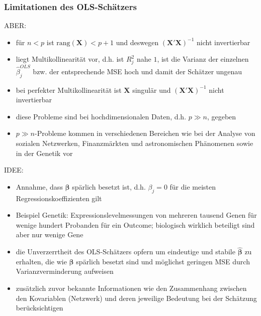 \documentclass{beamer}
\begin{document}
\begin{frame} %
  \frametitle{Limitationen des OLS-Schätzers} 
  ABER: 
    \begin{itemize}
    \item für $n < p$ ist $\text{rang}(\mathbf{X}
    )<p+1$ und deswegen $\left(\mathbf{X}'\mathbf{X}\right)^{-1}$ nicht invertierbar
    \item liegt Multikollinearität vor, d.h. ist $R^2_j$ nahe $1$, ist die Varianz der einzelnen $\hat{\beta}_j^{OLS}$ bzw. der entsprechende MSE hoch und damit der Schätzer ungenau
    \item bei perfekter Multikollinearität ist $\mathbf{X}$ singulär und $\left(\mathbf{X}'\mathbf{X}\right)^{-1}$ nicht invertierbar
    \end{itemize}
    \begin{itemize}
    \item diese Probleme sind bei hochdimensionalen Daten, d.h. $p \gg n$, gegeben
    \item $p \gg n$-Probleme kommen in verschiedenen Bereichen wie bei der Analyse von sozialen Netzwerken, Finanzmärkten und astronomischen Phänomenen sowie in der Genetik vor
    \end{itemize}
    
\end{frame}

\begin{frame}
	IDEE:
	\begin{itemize}
	\item Annahme, dass $\boldsymbol{\beta}$ spärlich besetzt ist, d.h. $\beta_j=0$ für die meisten Regressionskoeffizienten gilt
	\item Beispiel Genetik: Expressionslevelmessungen von mehreren tausend Genen für wenige hundert Probanden für ein Outcome; biologisch wirklich beteiligt sind aber nur wenige Gene
	\item die Unverzerrtheit des OLS-Schätzers {\glqq}opfern{\grqq} um eindeutige und stabile $\boldsymbol{\hat{\beta}}$ zu erhalten, die wie $\boldsymbol{\beta}$ spärlich besetzt sind und möglichst geringen MSE durch Varianzverminderung aufweisen
	\item zusätzlich zuvor bekannte Informationen wie den Zusammenhang zwischen den Kovariablen (Netzwerk) und deren jeweilige Bedeutung bei der Schätzung berücksichtigen
	\end{itemize}
\end{frame}
\end{document}
